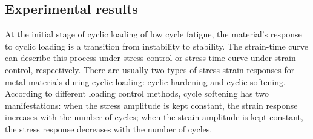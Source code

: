 \subsection{Experimental results}
\noindent
At the initial stage of cyclic loading of low cycle fatigue, the material's response to cyclic loading is a transition from instability to stability.
The strain-time curve can describe this process under stress control or stress-time curve under strain control, respectively.
There are usually two types of stress-strain responses for metal materials during cyclic loading: cyclic hardening and cyclic softening.
According to different loading control methods, cycle softening has two manifestations: when the stress amplitude is kept constant, the strain response increases with the number of cycles; when the strain amplitude is kept constant, the stress response decreases with the number of cycles.

